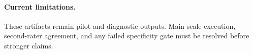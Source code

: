 \paragraph{Current limitations.}
These artifacts remain pilot and diagnostic outputs. Main-scale execution, second-rater agreement, and any failed specificity gate must be resolved before stronger claims.
